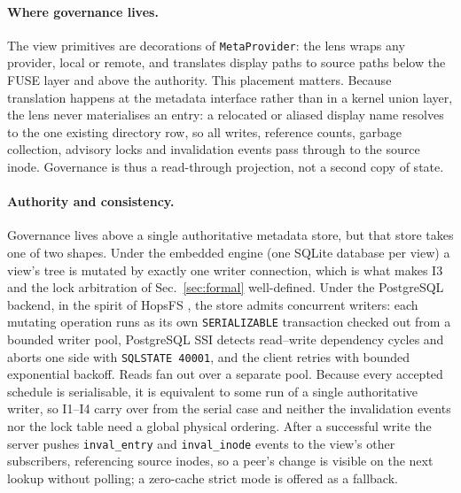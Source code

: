 \documentclass[numberedsection,acmtos]{acmart}
\begin{document}
\paragraph{Where governance lives.} The view primitives are decorations of
\texttt{MetaProvider}: the lens wraps any provider, local or remote, and
translates display paths to source paths below the FUSE layer and above the
authority. This placement matters. Because translation happens at the metadata
interface rather than in a kernel union layer, the lens never materialises an
entry: a relocated or aliased display name resolves to the one existing
directory row, so all writes, reference counts, garbage collection, advisory
locks and invalidation events pass through to the source inode. Governance is
thus a read-through projection, not a second copy of state.

\paragraph{Authority and consistency.} Governance lives above a single
authoritative metadata store, but that store takes one of two shapes. Under the
embedded engine (one SQLite database per view) a view's tree is mutated by
exactly one writer connection, which is what makes I3 and the lock arbitration
of Sec.~\ref{sec:formal} well-defined. Under the PostgreSQL backend, in the
spirit of HopsFS \citep{hopsfs}, the store admits concurrent writers: each
mutating operation runs as its own \texttt{SERIALIZABLE} transaction checked out
from a bounded writer pool, PostgreSQL SSI \citep{ports2012} detects read--write
dependency cycles and aborts one side with \texttt{SQLSTATE\,40001}, and the
client retries with bounded exponential backoff. Reads fan out over a separate
pool. Because every accepted schedule is serialisable, it is equivalent to some
run of a single authoritative writer, so I1--I4 carry over from the serial case
and neither the invalidation events nor the lock table need a global physical
ordering. After a successful write the server pushes
\texttt{inval\_entry} and \texttt{inval\_inode} events to the view's other
subscribers, referencing source inodes, so a peer's change is visible on the
next lookup without polling; a zero-cache strict mode is offered as a fallback.
\end{document}
